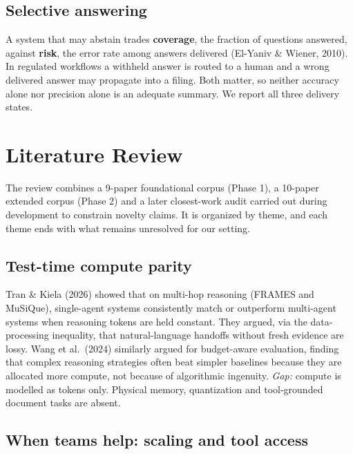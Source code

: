 \documentclass[letterpaper]{article}
\begin{document}
\subsection{Selective answering}\label{selective-answering}

A system that may abstain trades \textbf{coverage}, the fraction of questions answered, against \textbf{risk}, the error rate among answers delivered (El-Yaniv \& Wiener, 2010). In regulated workflows a withheld answer is routed to a human and a wrong delivered answer may propagate into a filing. Both matter, so neither accuracy alone nor precision alone is an adequate summary. We report all three delivery states.

\section{Literature Review}\label{literature-review}

The review combines a 9-paper foundational corpus (Phase 1), a 10-paper extended corpus (Phase 2) and a later closest-work audit carried out during development to constrain novelty claims. It is organized by theme, and each theme ends with what remains unresolved for our setting.

\subsection{Test-time compute parity}\label{test-time-compute-parity}

Tran \& Kiela (2026) showed that on multi-hop reasoning (FRAMES and MuSiQue), single-agent systems consistently match or outperform multi-agent systems when reasoning tokens are held constant. They argued, via the data-processing inequality, that natural-language handoffs without fresh evidence are lossy. Wang et al.~(2024) similarly argued for budget-aware evaluation, finding that complex reasoning strategies often beat simpler baselines because they are allocated more compute, not because of algorithmic ingenuity. \emph{Gap:} compute is modelled as tokens only. Physical memory, quantization and tool-grounded document tasks are absent.

\subsection{When teams help: scaling and tool access}\label{when-teams-help-scaling-and-tool-access}
\end{document}

